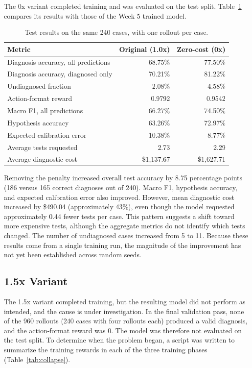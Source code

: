 \documentclass[11pt]{article}
\begin{document}
The 0x variant completed training and was evaluated on the test split.
Table~\ref{tab:test} compares its results with those of the Week 5 trained
model.

\begin{table}[ht]
  \centering
  \caption{Test results on the same 240 cases, with one rollout per case.}
  \label{tab:test}
  \begin{tabular}{lrr}
    \toprule
    Metric & Original (1.0x) & Zero-cost (0x) \\
    \midrule
    Diagnosis accuracy, all predictions & 68.75\% & 77.50\% \\
    Diagnosis accuracy, diagnosed only & 70.21\% & 81.22\% \\
    Undiagnosed fraction & 2.08\% & 4.58\% \\
    Action-format reward & 0.9792 & 0.9542 \\
    Macro F1, all predictions & 66.27\% & 74.50\% \\
    Hypothesis accuracy & 63.26\% & 72.97\% \\
    Expected calibration error & 10.38\% & 8.77\% \\
    Average tests requested & 2.73 & 2.29 \\
    Average diagnostic cost & \$1,137.67 & \$1,627.71 \\
    \bottomrule
  \end{tabular}
\end{table}

Removing the penalty increased overall test accuracy by 8.75 percentage points
(186 versus 165 correct diagnoses out of 240). Macro F1, hypothesis accuracy,
and expected calibration error also improved. However, mean diagnostic cost
increased by \$490.04 (approximately 43\%), even though the model requested
approximately 0.44 fewer tests per case. This pattern suggests a shift toward
more expensive tests, although the aggregate metrics do not identify which
tests changed. The number of undiagnosed cases increased from 5 to 11. Because
these results come from a single training run, the magnitude of the
improvement has not yet been established across random seeds.

\subsection*{1.5x Variant}

The 1.5x variant completed training, but the resulting model did not perform
as intended, and the cause is under investigation. In the final validation
pass, none of the 960 rollouts (240 cases with four rollouts each) produced a
valid diagnosis, and the action-format reward was 0. The model was therefore
not evaluated on the test split. To determine when the problem began, a script
was written to summarize the training rewards in each of the three training
phases (Table~\ref{tab:collapse}).
\end{document}
